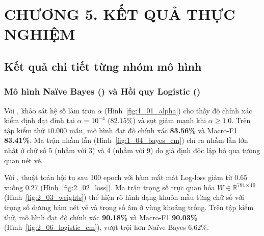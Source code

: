 \section*{CHƯƠNG 5. KẾT QUẢ THỰC NGHIỆM}
\setcounter{section}{5}
\setcounter{subsection}{0}

\subsection{Kết quả chi tiết từng nhóm mô hình}

\subsubsection{Mô hình Naïve Bayes () và Hồi quy Logistic ()}
Với , khảo sát hệ số làm trơn $\alpha$ (Hình~\ref{fig:1_01_alpha}) cho thấy độ chính xác kiểm định đạt đỉnh tại $\alpha = 10^{-4}$ ($82.15\%$) và sụt giảm mạnh khi $\alpha \ge 1.0$. Trên tập kiểm thử $10.000$ mẫu, mô hình đạt độ chính xác \textbf{83.56\%} và Macro-F1 \textbf{83.41\%}. Ma trận nhầm lẫn (Hình~\ref{fig:1_04_bayes_cm}) chỉ ra nhầm lẫn lớn nhất ở chữ số 5 (nhầm với 3) và 4 (nhầm với 9) do giả định độc lập bỏ qua tương quan nét vẽ.

Với , thuật toán hội tụ sau 100 epoch với hàm mất mát Log-loss giảm từ $0.65$ xuống $0.27$ (Hình~\ref{fig:2_02_loss}). Ma trận trọng số trực quan hóa $W \in \mathbb{R}^{784 \times 10}$ (Hình~\ref{fig:2_03_weights}) thể hiện rõ hình dạng khuôn mẫu từng chữ số với trọng số dương bám nét vẽ và trọng số âm ở vùng khoảng trống. Trên tập kiểm thử, mô hình đạt độ chính xác \textbf{90.18\%} và Macro-F1 \textbf{90.03\%} (Hình~\ref{fig:2_06_logistic_cm}), vượt trội hơn Naïve Bayes $6.62\%$.

